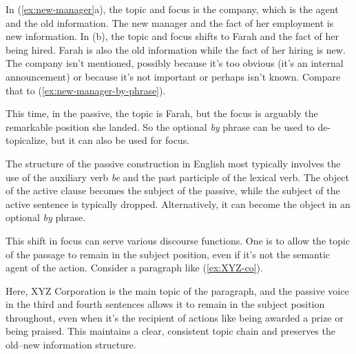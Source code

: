 \ea\label{ex:new-manager}
    \z
\z

In (\ref{ex:new-manager}a), the topic and focus is the company, which is the agent and the old information. The new manager and the fact of her employment is new information. In (b), the topic and focus shifts to Farah and the fact of her being hired. Farah is also the old information while the fact of her hiring is new. The company isn't mentioned, possibly because it's too obvious (it's an internal announcement) or because it's not important or perhaps isn't known. Compare that to (\ref{ex:new-manager-by-phrase}).

\ea\label{ex:new-manager-by-phrase}
    \z
\z
{}
This time, in the passive, the topic is Farah, but the focus is arguably the remarkable position she landed. So the optional \textit{by} phrase can be used to de-topicalize, but it can also be used for focus.

The structure of the passive construction in English most typically involves the use of the auxiliary verb \textit{be} and the past participle of the lexical verb. The object of the active clause becomes the subject of the passive, while the subject of the active sentence is typically dropped. Alternatively, it can become the object in an optional \textit{by} phrase.

This shift in focus can serve various discourse functions. One is to allow the topic of the passage to remain in the subject position, even if it's not the semantic agent of the action. Consider a paragraph like (\ref{ex:XYZ-co}).

\label{ex:XYZ-co}
\z

Here, XYZ Corporation is the main topic of the paragraph, and the passive voice in the third and fourth sentences allows it to remain in the subject position throughout, even when it's the recipient of actions like being awarded a prize or being praised. This maintains a clear, consistent topic chain and preserves the old--new information structure.

